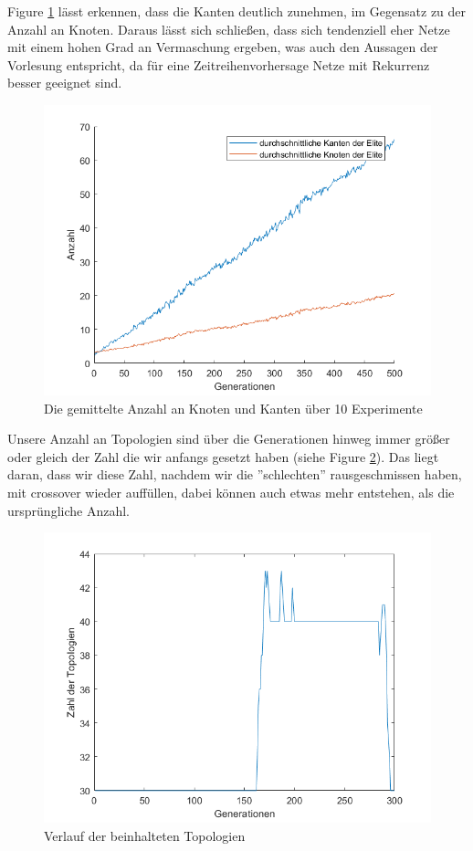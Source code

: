 \documentclass{hbrs-ecta-report}
\begin{document}
Figure \ref{fig:KantenUndKnoten} lässt erkennen, dass die Kanten deutlich zunehmen, im Gegensatz zu der Anzahl an Knoten. Daraus lässt sich schließen, dass sich tendenziell eher Netze mit einem hohen Grad an Vermaschung ergeben, was auch den Aussagen der Vorlesung entspricht, da für eine Zeitreihenvorhersage Netze mit Rekurrenz besser geeignet sind.\\
\begin{figure}[h!]
	\includegraphics[width=\linewidth]{img/KantenUndKnoten}
	\caption{Die gemittelte Anzahl an Knoten und Kanten über 10 Experimente}
	\label{fig:KantenUndKnoten}
\end{figure}

Unsere Anzahl an Topologien sind über die Generationen hinweg immer größer oder gleich der Zahl die wir anfangs gesetzt haben (siehe Figure \ref{fig:VerlaufTopo}). Das liegt daran, dass wir diese Zahl, nachdem wir die ''schlechten'' rausgeschmissen haben, mit crossover wieder auffüllen, dabei können auch etwas mehr entstehen, als die ursprüngliche Anzahl.
\begin{figure}[h!]
	\includegraphics[width=\linewidth]{img/VerlaufTopo}
	\caption{Verlauf der beinhalteten Topologien}
	\label{fig:VerlaufTopo}
\end{figure}
\end{document}
